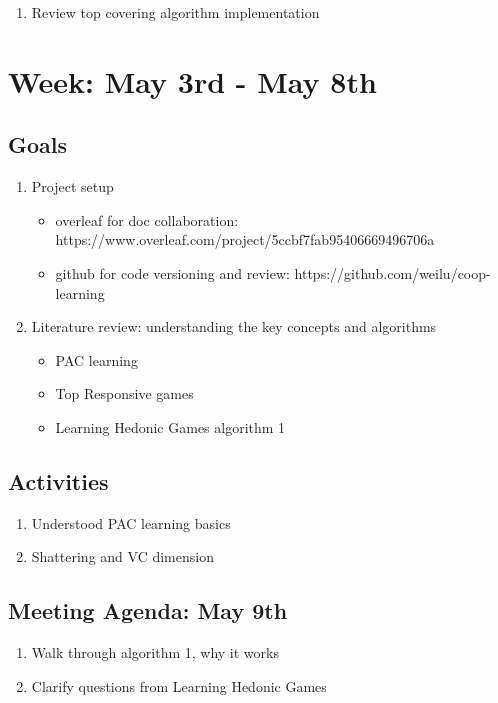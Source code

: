 \documentclass[a4paper]{article}
\begin{document}
\begin{enumerate}
  \item Review top covering algorithm implementation
\end{enumerate}

\section*{Week: May 3rd - May 8th}

\subsection*{Goals}

\begin{enumerate}
  \item Project setup
  \begin{itemize}
    \item overleaf for doc collaboration: https://www.overleaf.com/project/5ccbf7fab95406669496706a
    \item github for code versioning and review: https://github.com/weilu/coop-learning
  \end{itemize}

  \item Literature review: understanding the key concepts and algorithms
  \begin{itemize}
    \item PAC learning
    \item Top Responsive games
    \item Learning Hedonic Games \cite{ijcai2017-380} algorithm 1
  \end{itemize}

\end{enumerate}

\subsection*{Activities}

\begin{enumerate}
  \item Understood PAC learning basics \cite{Valiant:1984:TL:1968.1972}
  \item Shattering and VC dimension \cite{vc}
\end{enumerate}

\subsection*{Meeting Agenda: May 9th}

\begin{enumerate}
  \item Walk through algorithm 1, why it works
  \item Clarify questions from Learning Hedonic Games \cite{ijcai2017-380}
\end{enumerate}

\end{document}
